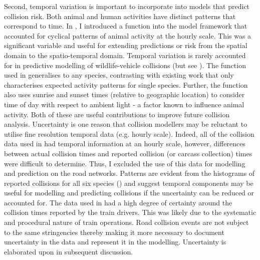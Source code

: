 Second, temporal variation is important to incorporate into models that predict collision risk. Both animal and human activities have distinct patterns that correspond to time. In , I introduced a function into the model framework that accounted for cyclical patterns of animal activity at the hourly scale. This was a significant variable and useful for extending predictions or risk from the spatial domain to the spatio-temporal domain. Temporal variation is rarely accounted for in predictive modelling of wildlife-vehicle collisions (but see \cite{beau10,gund98,neum12}). The function used in  generalises to any species, contrasting with existing work that only characterises expected activity patterns for single species. Further, the function also uses sunrise and sunset times (relative to geographic location) to consider time of day with respect to ambient light - a factor known to influence animal activity. Both of these are useful contributions to improve future collision analysis. Uncertainty is one reason that collision modellers may be reluctant to utilise fine resolution temporal data (e.g. hourly scale). Indeed, all of the collision data used in  had temporal information at an hourly scale, however, differences between actual collision times and reported collision (or carcass collection) times were difficult to determine. Thus, I excluded the use of this data for modelling and prediction on the road networks. Patterns are evident from the histograms of reported collisions for all six species () and suggest temporal components may be useful for modelling and predicting collisions if the uncertainty can be reduced or accounted for. The data used in  had a high degree of certainty around the collision times reported by the train drivers. This was likely due to the systematic and procedural nature of train operations. Road collision events are not subject to the same stringencies thereby making it more necessary to document uncertainty in the data and represent it in the modelling. Uncertainty is elaborated upon in subsequent discussion. 

